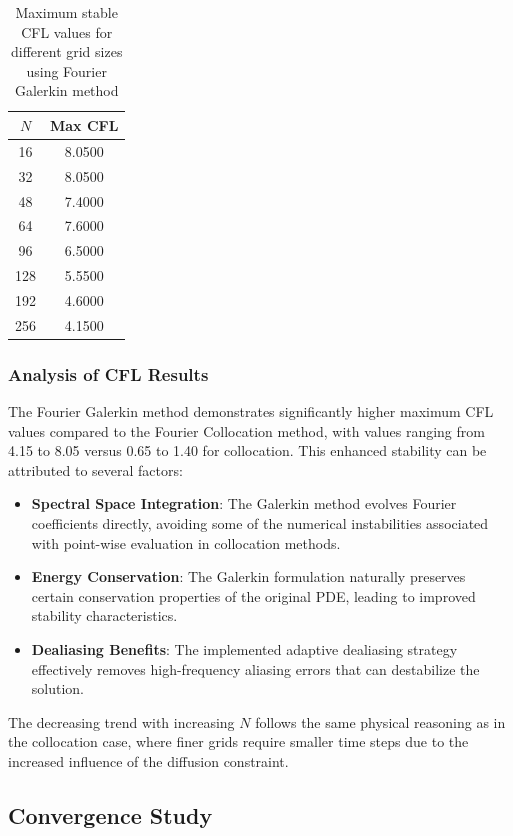 \begin{table}[h]
	\centering
	\begin{tabular}{|c|c|}
		\hline
		$N$ & Max CFL \\
		\hline
		16  & 8.0500  \\
		32  & 8.0500  \\
		48  & 7.4000  \\
		64  & 7.6000  \\
		96  & 6.5000  \\
		128 & 5.5500  \\
		192 & 4.6000  \\
		256 & 4.1500  \\
		\hline
	\end{tabular}
	\caption{Maximum stable CFL values for different grid sizes using Fourier Galerkin method}
	\label{tab:cfl_galerkin}
\end{table}

\subsubsection{Analysis of CFL Results}
The Fourier Galerkin method demonstrates significantly higher maximum CFL values compared to the Fourier Collocation method, with values ranging from 4.15 to 8.05 versus 0.65 to 1.40 for collocation. This enhanced stability can be attributed to several factors:

\begin{itemize}
	\item \textbf{Spectral Space Integration}: The Galerkin method evolves Fourier coefficients directly, avoiding some of the numerical instabilities associated with point-wise evaluation in collocation methods.
	\item \textbf{Energy Conservation}: The Galerkin formulation naturally preserves certain conservation properties of the original PDE, leading to improved stability characteristics.
	\item \textbf{Dealiasing Benefits}: The implemented adaptive dealiasing strategy effectively removes high-frequency aliasing errors that can destabilize the solution.
\end{itemize}

The decreasing trend with increasing $N$ follows the same physical reasoning as in the collocation case, where finer grids require smaller time steps due to the increased influence of the diffusion constraint.

\subsection{Convergence Study}

